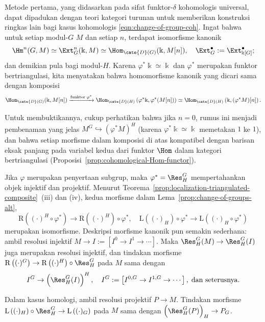 \begin{remark}\label{rem:change-of-group-Yoneda}
	Metode pertama, yang didasarkan pada sifat funktor-$\delta$ kohomologis
	universal, dapat dipadukan dengan teori kategori turunan untuk memberikan
	konstruksi ringkas lain bagi kasus kohomologis
	\eqref{eqn:change-of-group-coh}. Ingat bahwa untuk setiap modul-$G$ $M$ dan
	setiap $n$, terdapat isomorfisme kanonik
	\[ \Hm^n(G, M) \simeq \Ext^n_G(\Bbbk, M) \simeq \Hom_{\cate{D}(G)}(\Bbbk, M[n]), \quad \Ext^\bullet_G := \Ext^\bullet_{\Bbbk[G]}; \]
	dan demikian pula bagi modul-$H$. Karena
	$\varphi^*\Bbbk\simeq\Bbbk$ dan $\varphi^*$ merupakan funktor
	bertriangulasi, kita menyatakan bahwa homomorfisme kanonik yang dicari sama
	dengan komposisi
	\[ \Hom_{\cate{D}(G)}(\Bbbk, M[n]) \xrightarrow{\text{funktor} \;\varphi^*} \Hom_{\cate{D}(H)}\left( \varphi^* \Bbbk, \varphi^* (M[n])\right) \simeq \Hom_{\cate{D}(H)}\left(\Bbbk, (\varphi^* M)[n]\right). \]

	Untuk membuktikannya, cukup perhatikan bahwa jika $n=0$, rumus ini menjadi
	pembenaman yang jelas $M^G\hookrightarrow(\varphi^*M)^H$ (karena
	$\varphi^*\Bbbk\simeq\Bbbk$ memetakan $1$ ke $1$), dan bahwa setiap
	morfisme dalam komposisi di atas kompatibel dengan barisan eksak panjang pada
	variabel kedua dari funktor $\Hom$ dalam kategori bertriangulasi
	(Proposisi~\ref{prop:cohomological-Hom-functor}).
\end{remark}

\begin{remark}\label{rem:change-of-group-coh}
	Jika $\varphi$ merupakan penyertaan subgrup, maka
	$\varphi^*=\Res^G_H$ mempertahankan objek injektif dan projektif. Menurut
	Teorema~\ref{prop:localization-triangulated-composite}~(iii) dan (iv), kedua
	morfisme dalam Lema~\ref{prop:change-of-groups-alt},
	\[ \mathrm{R}\left( (\cdot)^H \circ \varphi^* \right) \to \mathrm{R}\left( (\cdot)^H \right) \circ \varphi^*, \quad
	\mathrm{L}\left( (\cdot)_H \right) \circ \varphi^* \to \mathrm{L} \left( (\cdot)_H \circ \varphi^* \right) \]
	merupakan isomorfisme. Deskripsi morfisme kanonik pun semakin sederhana:
	ambil resolusi injektif $M\to I:=[I^0\to I^1\to\cdots]$. Maka
	$\Res^G_H(M)\to\Res^G_H(I)$ juga merupakan resolusi injektif, dan tindakan
	morfisme
	$\mathrm{R}\left((\cdot)^G\right)\to
	\mathrm{R}\left((\cdot)^H\right)\circ\Res^G_H$ pada $M$ sama dengan
	\[ I^G \to \left( \Res^G_H(I)\right)^H, \quad I^G := \left[ I^{0, G} \to I^{1, G} \to \cdots \right], \;\text{dan seterusnya}. \]

	Dalam kasus homologi, ambil resolusi projektif $P\to M$. Tindakan morfisme
	$\mathrm{L}\left((\cdot)_H\right)\circ\Res^G_H
	\to\mathrm{L}\left((\cdot)_G\right)$ pada $M$ sama dengan
	$\left(\Res^G_H(P)\right)_H\to P_G$.
\end{remark}

